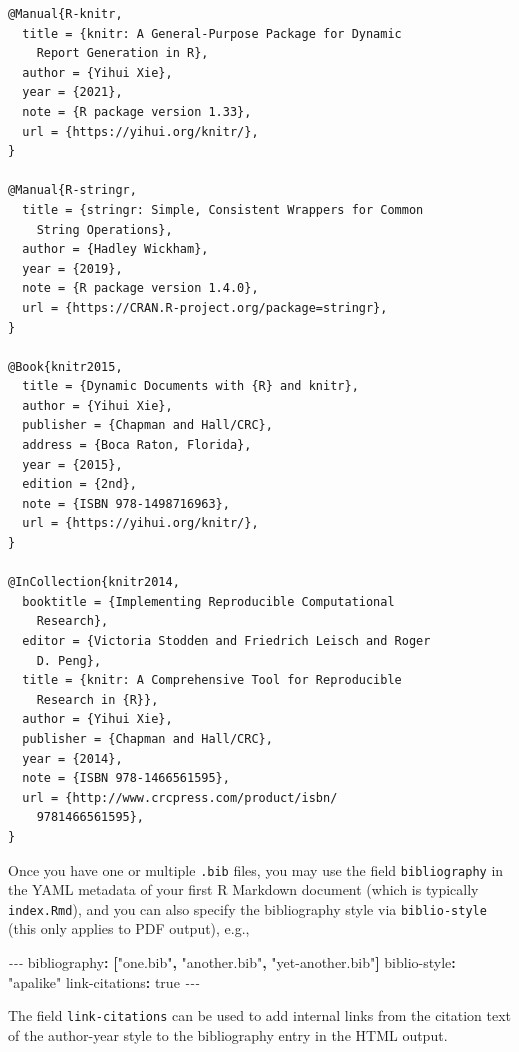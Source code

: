 \documentclass[
  12pt,
]{krantz}
\newenvironment{Shaded}{\begin{snugshade}}{\end{snugshade}}
\newcommand{\AttributeTok}[1]{\textcolor[rgb]{0.77,0.63,0.00}{#1}}
\newcommand{\CharTok}[1]{\textcolor[rgb]{0.31,0.60,0.02}{#1}}
\newcommand{\FunctionTok}[1]{\textcolor[rgb]{0.00,0.00,0.00}{#1}}
\newcommand{\KeywordTok}[1]{\textcolor[rgb]{0.13,0.29,0.53}{\textbf{#1}}}
\newcommand{\PreprocessorTok}[1]{\textcolor[rgb]{0.56,0.35,0.01}{\textit{#1}}}
\newcommand{\StringTok}[1]{\textcolor[rgb]{0.31,0.60,0.02}{#1}}
\theoremstyle{definition}
\theoremstyle{definition}
\theoremstyle{definition}
\theoremstyle{definition}
\theoremstyle{remark}
\begin{document}
\begin{verbatim}
@Manual{R-knitr,
  title = {knitr: A General-Purpose Package for Dynamic
    Report Generation in R},
  author = {Yihui Xie},
  year = {2021},
  note = {R package version 1.33},
  url = {https://yihui.org/knitr/},
}

@Manual{R-stringr,
  title = {stringr: Simple, Consistent Wrappers for Common
    String Operations},
  author = {Hadley Wickham},
  year = {2019},
  note = {R package version 1.4.0},
  url = {https://CRAN.R-project.org/package=stringr},
}

@Book{knitr2015,
  title = {Dynamic Documents with {R} and knitr},
  author = {Yihui Xie},
  publisher = {Chapman and Hall/CRC},
  address = {Boca Raton, Florida},
  year = {2015},
  edition = {2nd},
  note = {ISBN 978-1498716963},
  url = {https://yihui.org/knitr/},
}

@InCollection{knitr2014,
  booktitle = {Implementing Reproducible Computational
    Research},
  editor = {Victoria Stodden and Friedrich Leisch and Roger
    D. Peng},
  title = {knitr: A Comprehensive Tool for Reproducible
    Research in {R}},
  author = {Yihui Xie},
  publisher = {Chapman and Hall/CRC},
  year = {2014},
  note = {ISBN 978-1466561595},
  url = {http://www.crcpress.com/product/isbn/
    9781466561595},
}
\end{verbatim}

Once you have one or multiple \texttt{.bib} files, you may use the field \texttt{bibliography} in the YAML metadata of your first R Markdown document (which is typically \texttt{index.Rmd}), and you can also specify the bibliography style via \texttt{biblio-style} (this only applies to PDF output), e.g.,

\begin{Shaded}
\begin{Highlighting}[]
\PreprocessorTok{{-}{-}{-}}
\FunctionTok{bibliography}\KeywordTok{:}\AttributeTok{ }\KeywordTok{[}\StringTok{"one.bib"}\KeywordTok{,}\AttributeTok{ }\StringTok{"another.bib"}\KeywordTok{,}\AttributeTok{ }\StringTok{"yet{-}another.bib"}\KeywordTok{]}
\FunctionTok{biblio{-}style}\KeywordTok{:}\AttributeTok{ }\StringTok{"apalike"}
\FunctionTok{link{-}citations}\KeywordTok{:}\AttributeTok{ }\CharTok{true}
\PreprocessorTok{{-}{-}{-}}
\end{Highlighting}
\end{Shaded}

The field \texttt{link-citations} can be used to add internal links from the citation text of the author-year style to the bibliography entry in the HTML output.
\end{document}
